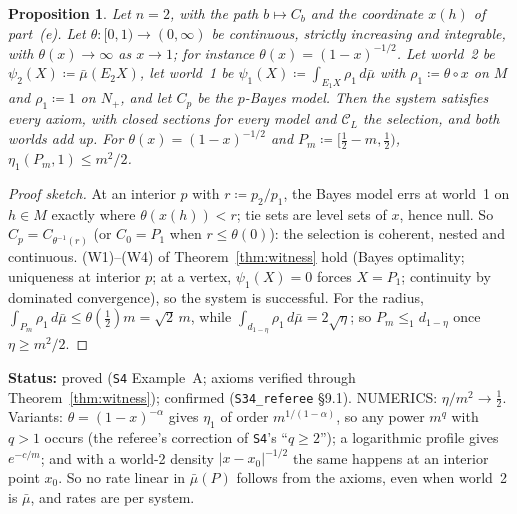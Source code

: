 \documentclass[11pt]{article}
\newtheorem{proposition}[theorem]{Proposition}
\theoremstyle{definition}
\theoremstyle{remark}
\newcommand{\C}{\mathcal C}
\newcommand{\src}[1]{\texttt{#1}}
\newcommand{\status}[1]{\par\smallskip\noindent\textbf{Status:} #1\par\smallskip}
\begin{document}
\begin{proposition}\label{prop:ExA}
Let $n=2$, with the path $b\mapsto C_b$ and the coordinate $x(h)$ of part~(e). Let $\theta:[0,1)\to(0,\infty)$ be continuous, strictly increasing and integrable, with $\theta(x)\to\infty$ as $x\to1$; for instance $\theta(x)=(1-x)^{-1/2}$. Let world~2 be $\psi_2(X)\coloneqq\bar\mu(E_2X)$, let world~1 be $\psi_1(X)\coloneqq\int_{E_1X}\rho_1\,d\bar\mu$ with $\rho_1\coloneqq\theta\circ x$ on $M$ and $\rho_1\coloneqq1$ on $N_+$, and let $C_p$ be the $p$-Bayes model. Then the system satisfies every axiom, with closed sections for every model and $\C_L$ the selection, and both worlds add up. For $\theta(x)=(1-x)^{-1/2}$ and $P_m\coloneqq[\tfrac12-m,\tfrac12)$, $\eta_1(P_m,1)\le m^2/2$.
\end{proposition}
\begin{proof}[Proof sketch]
At an interior $p$ with $r\coloneqq p_2/p_1$, the Bayes model errs at world~1 on $h\in M$ exactly where $\theta(x(h))<r$; tie sets are level sets of $x$, hence null. So $C_p=C_{\theta^{-1}(r)}$ (or $C_0=P_1$ when $r\le\theta(0)$): the selection is coherent, nested and continuous. (W1)--(W4) of Theorem~\ref{thm:witness} hold (Bayes optimality; uniqueness at interior $p$; at a vertex, $\psi_1(X)=0$ forces $X=P_1$; continuity by dominated convergence), so the system is successful. For the radius, $\int_{P_m}\rho_1\,d\bar\mu\le\theta(\tfrac12)m=\sqrt2\,m$, while $\int_{d_{1-\eta}}\rho_1\,d\bar\mu=2\sqrt\eta$; so $P_m\le_1d_{1-\eta}$ once $\eta\ge m^2/2$.
\end{proof}
\status{proved (\src{S4} Example~A; axioms verified through Theorem~\ref{thm:witness}); confirmed (\src{S34\_referee} \S9.1). NUMERICS: $\eta/m^2\to\tfrac12$. Variants: $\theta=(1-x)^{-\alpha}$ gives $\eta_1$ of order $m^{1/(1-\alpha)}$, so any power $m^q$ with $q>1$ occurs (the referee's correction of \src{S4}'s ``$q\ge2$''); a logarithmic profile gives $e^{-c/m}$; and with a world-2 density $|x-x_0|^{-1/2}$ the same happens at an interior point $x_0$. So no rate linear in $\bar\mu(P)$ follows from the axioms, even when world~2 is $\bar\mu$, and rates are per system.}
\end{document}
